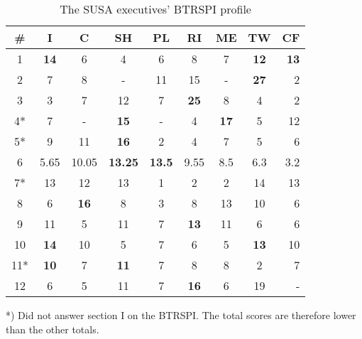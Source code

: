 \documentclass[a4paper,12pt,titlepage]{report}
\begin{document}
  \begin{table}
    \begin{center}  
      \begin{tabular*}{1.0\textwidth}
        {@{\extracolsep{\fill}}ccccccccr}
        \hline  
        \hline  
        \bf{\#} & \bf{I} & \bf{C} & \bf{SH} & \bf{PL} & \bf{RI} & \bf{ME} & \bf{TW} & \bf{CF}         \\
        \hline  
        \hline  
        1 & \bf{14}& 6      & 4          & 6            & 8       & 7       & \bf{12} & \bf{13} \\
        \hline 
        2 & 7      & 8      & -          & 11           & 15      & -       & \bf{27} & 2       \\
        \hline    
        3 & 3      & 7      & 12         & 7            & \bf{25} & 8       & 4       & 2       \\
        \hline    
        4* & 7     & -      & \bf{15}    & -            & 4       & \bf{17} & 5       & 12      \\
        \hline    
        5* & 9     & 11     & \bf{16}    & 2            & 4       & 7       & 5       & 6       \\
        \hline     
        6 & 5.65   & 10.05  & \bf{13.25} & \bf{13.5}    & 9.55    & 8.5     & 6.3     & 3.2     \\
        \hline     
        7* & 13    & 12     & 13         & 1            & 2       & 2       & 14      & 13      \\
        \hline     
        8 & 6      & \bf{16}& 8          & 3            & 8       & 13      & 10      & 6       \\
        \hline     
        9 & 11     & 5      & 11         & 7            & \bf{13} & 11      & 6       & 6       \\
        \hline     
        10 & \bf{14}& 10     & 5          & 7            & 6       & 5       & \bf{13} & 10      \\
        \hline     
        11* & \bf{10}& 7     & \bf{11}    & 7            & 8       & 8       & 2       & 7       \\
        \hline     
        12 & 6      & 5      & 11         & 7            & \bf{16} & 6       & 19      & -       \\ 
        \hline 
        \hline
      \end{tabular*}
    \end{center}
    \small{*) Did not answer section I on the BTRSPI.
   The total scores are therefore lower than the other totals.}
    \caption{The SUSA executives' BTRSPI profile}
  \end{table}
\end{document}
